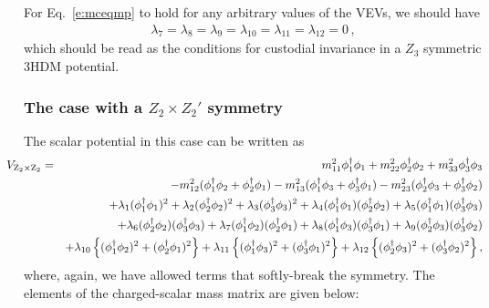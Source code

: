 \documentclass[11pt]{article}
\begin{document}
%
For Eq.~\eqref{e:mceqmp} to hold for any arbitrary values of the VEVs, we should have 
%
\begin{eqnarray}
	\label{e:z3_conditions}
	\lambda_7=\lambda_8=\lambda_9=\lambda_{10}=\lambda_{11}=\lambda_{12}=0\, ,
\end{eqnarray}
%
which should be read as the conditions for custodial invariance in a $Z_3$ symmetric 3HDM potential.  


\subsubsection{The case with a $Z_2\times Z_2'$ symmetry}
\label{ss:Z2xZ2}
%
The scalar potential in this case can be written as~\cite{Keus:2013hya}
%
\begin{eqnarray}
	\label{e:z2xz2_pot_v2}
\!\!\!	\!\!\!	\!\!\!	 V_{\rm{Z_2 \times Z_2}}&=&
	m_{11}^2 \phi_1^\dagger \phi_1 + m_{22}^2 \phi_2^\dagger \phi_2 + m_{33}^2 \phi_3^\dagger \phi_3 \nonumber \\
	&& - m_{12}^2 (\phi_1^\dagger \phi_2 + \phi_2^\dagger \phi_1) - m_{13}^2 (\phi_1^\dagger \phi_3 + \phi_3^\dagger \phi_1) -  m_{23}^2 (\phi_2^\dagger \phi_3 + \phi_3^\dagger \phi_2) \nonumber\\
	&&  + \lambda_1(\phi_1^\dagger \phi_1)^2 +\lambda_2(\phi_2^\dagger \phi_2)^2 + \lambda_3(\phi_3^\dagger \phi_3)^2+  \lambda_4(\phi_1^\dagger \phi_1)(\phi_2^\dagger \phi_2)  
	 + \lambda_5(\phi_1^\dagger \phi_1)(\phi_3^\dagger \phi_3) \nonumber \\
	 && + \lambda_6(\phi_2^\dagger \phi_2)(\phi_3^\dagger \phi_3) + \lambda_7(\phi_1^\dagger \phi_2)(\phi_2^\dagger \phi_1) 
	 + \lambda_8(\phi_1^\dagger \phi_3)(\phi_3^\dagger \phi_1) +\lambda_9(\phi_2^\dagger \phi_3)(\phi_3^\dagger \phi_2) \nonumber\\ 
	&&  + \lambda_{10}\left\{(\phi_1^\dagger \phi_2)^2+(\phi_2^\dagger \phi_1)^2 \right\} + \lambda_{11}\left\{(\phi_1^\dagger \phi_3)^2+(\phi_3^\dagger \phi_1)^2 \right\} 
	 + \lambda_{12}\left\{ (\phi_2^\dagger \phi_3)^2+(\phi_3^\dagger \phi_2)^2 \right\},
\end{eqnarray}
%
where, again, we have allowed terms that softly-break the symmetry.
The elements of the charged-scalar mass matrix are given below:
%
\end{document}
